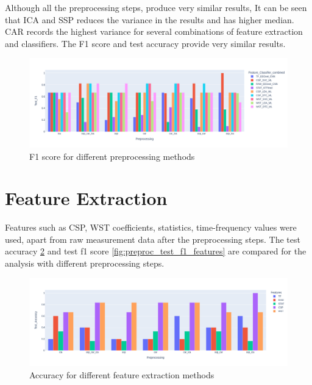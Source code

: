 Although all the preprocessing steps, produce very similar results, It can be seen that ICA and SSP reduces the variance in the results and has higher median. CAR records the highest variance for several combinations of feature extraction and classifiers. The F1 score and test accuracy provide very similar results.

     \begin{figure}[H] 
     \begin{center}
        \includegraphics[width=1.0\textwidth]{images/preproc_test_f1_feat_bar.png}
        \caption{F1 score for different preprocessing methods}
        \label{fig:test_f1}
    \end{center}    
    \end{figure}

\section{Feature Extraction}
Features such as CSP, WST coefficients, statistics, time-frequency values were used, apart from raw measurement data after the preprocessing steps. The test accuracy \ref{fig:preproc_test_acc_features} and test f1 score \ref{fig:preproc_test_f1_features} are compared for the analysis with different preprocessing steps.
     \begin{figure}[H] 
     \begin{center}
        \includegraphics[width=1.0\textwidth]{images/preproc_test_acc_features_bar.png}
        \caption{Accuracy for different feature extraction methods}
        \label{fig:preproc_test_acc_features}
        \end{center}
    \end{figure}

